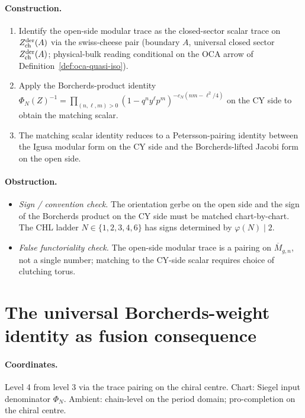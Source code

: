 \paragraph{Construction.}
\begin{enumerate}[nosep]
\item Identify the open-side modular trace as the closed-sector
  scalar trace on $Z^{\mathrm{der}}_{\mathrm{ch}}(A)$ via the swiss-cheese pair (boundary
  $A$, universal closed sector $Z^{\mathrm{der}}_{\mathrm{ch}}(A)$; physical-bulk reading
	  conditional on the OCA arrow of Definition~\ref{def:oca-quasi-iso}).
\item Apply the Borcherds-product identity
  $\Phi_N(Z)^{-1} = \prod_{(n, \ell, m) > 0} (1 - q^n y^\ell p^m)^{-c_N(nm - \ell^2/4)}$
  on the CY side to obtain the matching scalar.
\item The matching scalar identity reduces to a Petersson-pairing
  identity between the Igusa modular form on the CY side and the
  Borcherds-lifted Jacobi form on the open side.
\end{enumerate}

\paragraph{Obstruction.}
\begin{itemize}[nosep]
\item \emph{Sign / convention check.} The orientation gerbe on the
  open side and the sign of the Borcherds product on the CY side must
  be matched chart-by-chart. The CHL ladder
  $N \in \{1, 2, 3, 4, 6\}$ has signs determined by $\varphi(N) \mid 2$.
\item \emph{False functoriality check.} The open-side modular trace is
  a pairing on $\overline{M}_{g, n}$, not a single number; matching to
  the CY-side scalar requires choice of clutching torus.
\end{itemize}

\section{The universal Borcherds-weight identity as fusion consequence}
\label{sec:open-borcherds-as-fusion}

\paragraph{Coordinates.} Level 4 from level 3 via the trace pairing on
the chiral centre. Chart: Siegel input denominator $\Phi_N$. Ambient:
chain-level on the period domain; pro-completion on the chiral centre.

